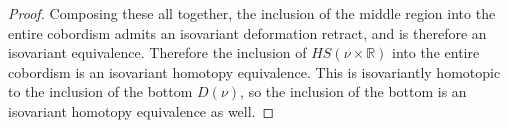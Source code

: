 \documentclass[11pt]{amsart}
\theoremstyle{definition}
\numberwithin{equation}{section}
\numberwithin{figure}{section}
\newcommand{\R}{\mathbb R}
\newcommand{\St}{\mathrm{St}}
\begin{document}
\begin{proof}
%	
%	

Composing these all together, the inclusion of the middle region into the entire cobordism admits an isovariant deformation retract, and is therefore an isovariant equivalence. Therefore the inclusion of $HS(\nu \times \R)$ into the entire cobordism is an isovariant homotopy equivalence. This is isovariantly homotopic to the inclusion of the bottom $D(\nu)$, so the inclusion of the bottom is an isovariant homotopy equivalence as well.



\end{proof}
\end{document}
